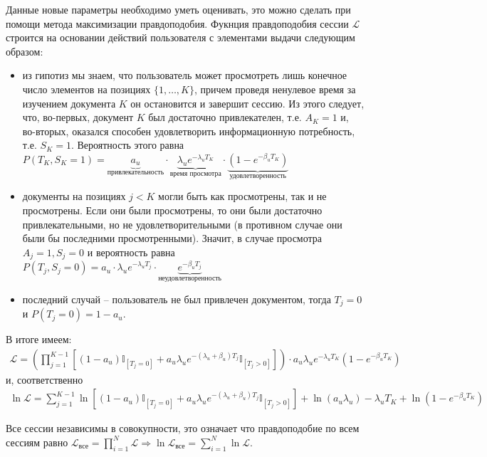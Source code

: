 \documentclass[diploma]{nanolab2015}
\begin{document}
Данные новые параметры необходимо уметь оценивать, это можно сделать при помощи метода максимизации правдоподобия. Фукнция правдоподобия сессии $\mathcal{L}$ строится на основании действий пользователя с элементами выдачи следующим образом:

\begin{itemize}
    \item из гипотиз мы знаем, что пользователь может просмотреть лишь конечное число элементов на позициях $\{1, \dots, K\}$, причем проведя ненулевое время за изучением документа $K$ он остановится и завершит сессию. Из этого следует, что, во-первых, документ $K$ был достаточно привлекателен, т.е. $A_K = 1$ и, во-вторых, оказался способен удовлетворить информационную потребность, т.е. $S_K = 1$. Вероятность этого равна $P(T_K, S_K = 1) = \underbrace{a_u}_{\text{привлекательность}} \cdot \underbrace{\lambda_u e^{-\lambda_u T_K}}_{\text{время просмотра}} \cdot \underbrace{(1 - e^{-\beta_u T_K})}_{\text{удовлетворенность}}$
    \item документы на позициях $j < K$ могли быть как просмотрены, так и не просмотрены. Если они были просмотрены, то они были достаточно привлекательными, но не удовлетворительными (в противном случае они были бы последними просмотренными). Значит, в случае просмотра $A_j = 1, S_j = 0$ и вероятность равна $P(T_j, S_j = 0) = a_u \cdot \lambda_u e^{-\lambda_u T_j} \cdot \underbrace{e^{-\beta_u T_j}}_{\text{неудовлетворенность}}$
    \item последний случай -- пользователь не был привлечен документом, тогда $T_j = 0$ и $P(T_j = 0) = 1 - a_u$.
\end{itemize}

В итоге имеем:
\begin{align}
    \mathcal{L} = \left( \prod_{j=1}^{K-1} \left[(1-a_u)\mathbb{I}_{[T_j=0]} + a_u \lambda_u e^{-(\lambda_u + \beta_u)T_j} \mathbb{I}_{[T_j > 0]} \right] \right) \cdot a_u \lambda_u e^{-\lambda_u T_K} (1 - e^{-\beta_u T_K})
\end{align}
и, соответственно
\begin{align}
    \ln\mathcal{L} = \sum_{j=1}^{K-1}\ln \left[ (1-a_u)\mathbb{I}_{[T_j=0]} + a_u \lambda_u e^{-(\lambda_u + \beta_u)T_j} \mathbb{I}_{[T_j > 0]} \right] + \ln(a_u\lambda_u) - \lambda_u T_K + \ln (1 - e^{-\beta_u T_K}) \label{mle:2}
\end{align}

Все сессии независимы в совокупности, это означает что правдоподобие по всем сессиям равно $\mathcal{L}_{\text{все}} = \prod_{i=1}^{N} \mathcal{L} \Rightarrow \ln \mathcal{L}_{\text{все}} = \sum_{i=1}^{N} \ln \mathcal{L}$. 
\end{document}
